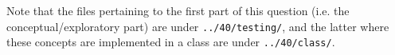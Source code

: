 Note that the files pertaining to the first part of this question (i.e. the conceptual/exploratory part) are under \texttt{../40/testing/}, and the latter where these concepts are implemented in a class are under \texttt{../40/class/}.
